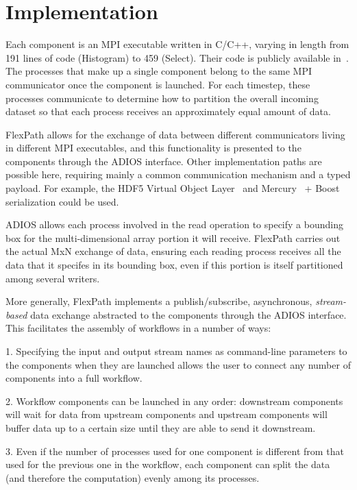 \section{Implementation}
\label{s:impl}

Each component is an MPI executable
written in C/C++, varying in length from
191 lines of code (Histogram) to
459 (Select).
Their code is publicly available
in~\cite{champsaur:superglue-repo}.
The processes that make up a single
component belong to the same MPI communicator
once the component is launched.
For each timestep, these processes
communicate to determine how to partition
the overall incoming dataset so that each
process receives an approximately
equal amount of data.

FlexPath allows for the exchange of data
between different communicators living
in different MPI executables, and this
functionality is presented
to the components through the ADIOS interface.
Other implementation paths
are possible here, requiring mainly a common communication
mechanism and a typed payload. For example, the HDF5 Virtual Object
Layer~\cite{folk:2011:hdf5} and Mercury~\cite{Soumagne:2013:mercury} +
Boost serialization could be used.

ADIOS allows each process
involved in the read operation to specify a
bounding box for the multi-dimensional
array portion it will receive.
FlexPath carries out the actual MxN exchange of data,
ensuring each reading process receives
all the data that it specifes in its bounding box,
even if this portion is itself partitioned among several writers.

More generally, FlexPath implements a publish/subscribe,
asynchronous, \textit{stream-based} data exchange abstracted to the
components through the ADIOS interface. This facilitates
the assembly of \sys workflows in a number of ways:

1. Specifying the input and output stream
names as command-line parameters to the \sys components 
when they are launched allows the user
to connect any number of components into
a full workflow.

2. Workflow components can be
launched in any order: downstream components
will wait for data from 
upstream components and upstream
components will buffer data up to a certain
size until they are able to send it
downstream.

3. Even if the number of processes used for one
component is different from that used for the previous
one in the workflow, each component can split the data
(and therefore the computation) evenly among its processes.

